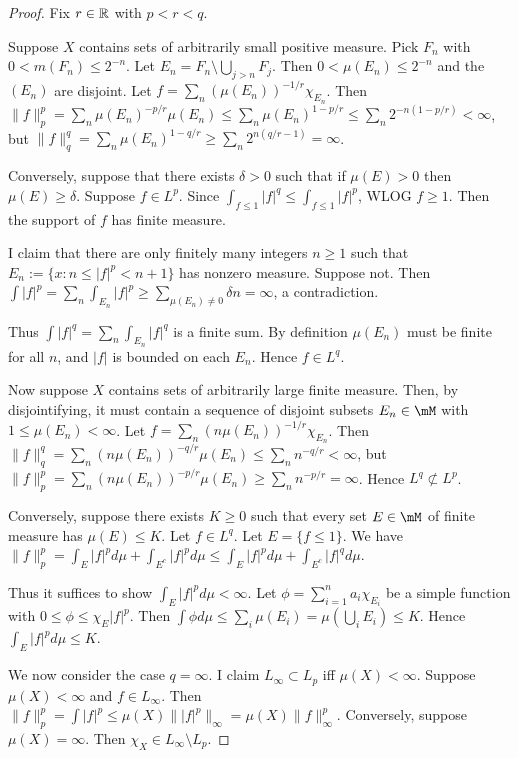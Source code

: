 \documentclass{article}
\begin{document}
\begin{proof}
Fix $r \in \mathbb{R}$ with $p < r < q$.

Suppose $X$ contains sets of arbitrarily small positive measure. Pick $F_n$ with $0 < m(F_n) \le 2^{-n}$.  Let $E_n = F_n \setminus \bigcup_{j > n} F_j$. Then $0 < \mu(E_n) \le 2^{-n}$ and the $(E_n)$ are disjoint.  Let $f = \sum_n (\mu(E_n))^{-1/r} \chi_{E_n}$.  Then $\|f\|_p^p = \sum_n \mu(E_n)^{-p/r} \mu(E_n) \le \sum_n \mu(E_n)^{1-p/r} \le \sum_n 2^{-n(1-p/r)} < \infty$, but $\|f\|_q^q = \sum_n \mu(E_n)^{1-q/r} \ge \sum_n 2^{n(q/r - 1)} = \infty$.

Conversely, suppose that there exists $\delta > 0$ such that if $\mu(E) > 0$ then $\mu(E) \ge \delta$. Suppose $f \in L^p$. Since $\int_{f \le 1} |f|^q \le \int_{f \le 1} |f|^p$, WLOG $f \ge 1$.  Then the support of $f$ has finite measure. 

I claim that there are only finitely many integers $n \ge 1$ such that $E_n := \{x : n \le |f|^p < n+1\}$ has nonzero measure. Suppose not. Then $\int |f|^p = \sum_n \int_{E_n} |f|^p \ge \sum_{\mu(E_n) \neq 0} \delta n = \infty$, a contradiction.

Thus $\int |f|^q = \sum_n \int_{E_n} |f|^q$ is a finite sum.  By definition $\mu(E_n)$ must be finite for all $n$, and $|f|$ is bounded on each $E_n$.  Hence $f \in L^q$.

Now suppose $X$ contains sets of arbitrarily large finite measure.  Then, by disjointifying, it must contain a sequence of disjoint subsets $E_n \in \mM$ with $1 \le \mu(E_n) < \infty$. Let $f = \sum_n (n \mu(E_n))^{-1/r} \chi_{E_n}$.  Then $\|f\|_q^q = \sum_n (n \mu(E_n))^{-q/r} \mu(E_n) \le \sum_n n^{-q/r} < \infty$, but $\|f\|_p^p = \sum_n (n \mu(E_n))^{-p/r} \mu(E_n) \ge \sum_n n^{-p/r} = \infty$.  Hence $L^q \not \subset L^p$.

Conversely, suppose there exists $K \ge 0$ such that every set $E \in \mM$ of finite measure has $\mu(E) \le K$. Let $f \in L^q$.  Let $E = \{ f \le 1 \}$.  We have $\|f\|_p^p = \int_E |f|^p d\mu + \int_{E^c} |f|^p d\mu \le \int_E |f|^p d\mu + \int_{E^c} |f|^q d\mu$.

Thus it suffices to show $\int_E |f|^p d\mu < \infty$. Let $\phi = \sum_{i=1}^n a_i \chi_{E_i}$ be a simple function with $0 \le \phi \le \chi_E |f|^p$. Then $\int \phi d\mu \le \sum_i \mu(E_i) = \mu(\bigcup_i E_i) \le K$.  Hence $\int_E |f|^p d\mu \le K$.

We now consider the case $q = \infty$. I claim $L_\infty \subset L_p$ iff $\mu(X) < \infty$. Suppose $\mu(X) < \infty$ and $f \in L_\infty$. Then $\|f\|_p^p = \int |f|^p \le \mu(X) \||f|^p\|_\infty = \mu(X) \|f\|_\infty^p$.  Conversely, suppose $\mu(X) = \infty$. Then $\chi_X \in L_\infty \setminus L_p$.
\end{proof}
\end{document}
